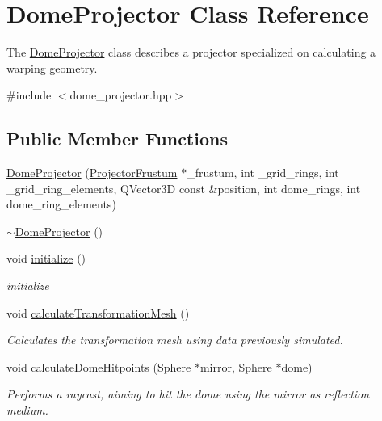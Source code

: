 \hypertarget{class_dome_projector}{}\section{Dome\+Projector Class Reference}
\label{class_dome_projector}


The \mbox{\hyperlink{class_dome_projector}{Dome\+Projector}} class describes a projector specialized on calculating a warping geometry.  




{\ttfamily \#include $<$dome\+\_\+projector.\+hpp$>$}

\subsection*{Public Member Functions}
\begin{DoxyCompactItemize}
\item 
\mbox{\hyperlink{class_dome_projector_aea4bdc99173b4fcc44388d5efb204ceb}{Dome\+Projector}} (\mbox{\hyperlink{class_projector_frustum}{Projector\+Frustum}} $\ast$\+\_\+frustum, int \+\_\+grid\+\_\+rings, int \+\_\+grid\+\_\+ring\+\_\+elements, Q\+Vector3D const \&position, int dome\+\_\+rings, int dome\+\_\+ring\+\_\+elements)
\item 
\mbox{\hyperlink{class_dome_projector_aa4ae5284677524033bcafb09dcd132b2}{$\sim$\+Dome\+Projector}} ()
\item 
\mbox{\label{class_dome_projector_a2fc9fff775752f59c2ff961f8696eba1}} 
void \mbox{\hyperlink{class_dome_projector_a2fc9fff775752f59c2ff961f8696eba1}{initialize}} ()
\begin{DoxyCompactList}\small\item\em initialize \end{DoxyCompactList}\item 
void \mbox{\hyperlink{class_dome_projector_a28963378c069176dc852605e02a12ed4}{calculate\+Transformation\+Mesh}} ()
\begin{DoxyCompactList}\small\item\em Calculates the transformation mesh using data previously simulated. \end{DoxyCompactList}\item 
void \mbox{\hyperlink{class_dome_projector_a1d8bd78cd24cbd92d6605b4cc3d061c3}{calculate\+Dome\+Hitpoints}} (\mbox{\hyperlink{class_sphere}{Sphere}} $\ast$mirror, \mbox{\hyperlink{class_sphere}{Sphere}} $\ast$dome)
\begin{DoxyCompactList}\small\item\em Performs a raycast, aiming to hit the dome using the mirror as reflection medium. \end{DoxyCompactList}\item 

\end{DoxyCompactItemize}
